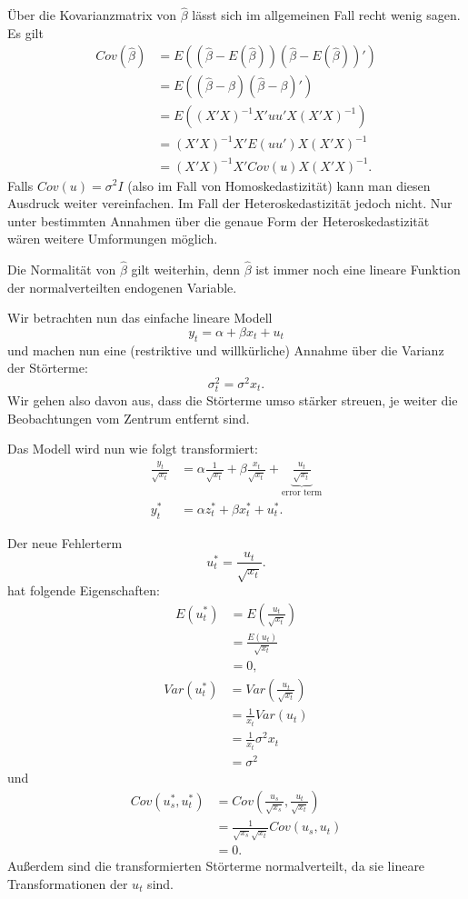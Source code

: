 \documentclass{article}
\begin{document}
Über die Kovarianzmatrix von $\hat\beta$ lässt sich im allgemeinen
Fall recht wenig sagen. Es gilt
\begin{align*}
Cov(\hat\beta) &= E((\hat\beta-E(\hat\beta))(\hat\beta-E(\hat\beta))') \\
&= E((\hat\beta-\beta)(\hat\beta-\beta)') \\
&=E((X'X)^{-1}X'uu'X(X'X)^{-1}) \\
&=(X'X)^{-1}X'E(uu')X(X'X)^{-1} \\
&=(X'X)^{-1}X'Cov(u) X(X'X)^{-1}.
\end{align*}
Falls $Cov(u)=\sigma^2I$ (also im Fall von Homoskedastizität) kann man
diesen Ausdruck weiter vereinfachen. Im Fall der Heteroskedastizität 
jedoch nicht. Nur unter bestimmten Annahmen über die genaue Form
der Heteroskedastizität wären weitere Umformungen möglich.

Die Normalität von $\hat\beta$ gilt weiterhin, denn $\hat\beta$ ist
immer noch eine lineare Funktion der normalverteilten endogenen
Variable.

Wir betrachten nun das einfache lineare Modell 
\[ y_t=\alpha+\beta x_t+u_t \]
und machen nun eine (restriktive und willkürliche) Annahme über die
Varianz der Störterme:
\[ \sigma_t^2=\sigma^2 x_t. \]
Wir gehen also davon aus, dass die Störterme umso stärker streuen,
je weiter die Beobachtungen vom Zentrum entfernt sind.

Das Modell wird nun wie folgt transformiert:
\begin{align*}
\frac{y_{t}}{\sqrt{x_{t}}} &=\alpha \frac{1}{\sqrt{x_{t}}}+\beta \frac{x_{t}}{\sqrt{x_{t}}}
+\underbrace{\frac{u_{t}}{\sqrt{x_{t}}}}_{\text{error term}}\\
y_{t}^{\ast} &=\alpha z_{t}^{\ast }+\beta x_{t}^{\ast }+u_{t}^{\ast}.
\end{align*}

Der neue Fehlerterm 
\[ u_{t}^{\ast }=\frac{u_{t}}{\sqrt{x_{t}}}. \]
hat folgende Eigenschaften:
\begin{align*}
E(u_{t}^{\ast }) &=E\left( \frac{u_{t}}{\sqrt{x_{t}}}\right) \\
&=\frac{E(u_{t}) }{\sqrt{x_{t}}} \\
&=0,
\end{align*}
\begin{align*}
Var(u_{t}^{\ast }) &= Var\left(\frac{u_{t}}{\sqrt{x_{t}}}\right)\\
&=\frac{1}{x_t}Var(u_t) \\
&=\frac{1}{x_t}\sigma^2 x_t \\
&=\sigma^2
\end{align*}
und
\begin{align*}
Cov(u_{s}^{\ast },u_{t}^{\ast}) &= Cov\left( 
\frac{u_{s}}{\sqrt{x_{s}}},\frac{u_{t}}{\sqrt{x_{t}}}\right) \\
&= \frac{1}{\sqrt{x_{s}}\sqrt{x_{t}}}Cov(u_s,u_t) \\
&= 0.
\end{align*}
Außerdem sind die transformierten Störterme normalverteilt,
da sie lineare Transformationen der $u_{t}$ sind.
\end{document}
